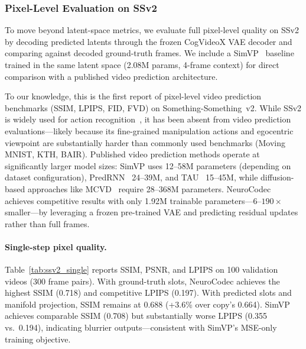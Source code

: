 \documentclass{article}
\newcommand{\method}{NeuroCodec}
\begin{document}
\subsubsection{Pixel-Level Evaluation on SSv2}
\label{sec:ssv2_pixels}

To move beyond latent-space metrics, we evaluate full pixel-level
quality on SSv2 by decoding predicted latents through the frozen
CogVideoX VAE decoder and comparing against decoded ground-truth frames.
We include a SimVP~\cite{gao2022simvp} baseline trained in the same
latent space (2.08M params, 4-frame context) for direct comparison with
a published video prediction architecture.

To our knowledge, this is the first report of pixel-level video
prediction benchmarks (SSIM, LPIPS, FID, FVD) on Something-Something~v2.
While SSv2 is widely used for action recognition~\cite{goyal2017something},
it has been absent from video prediction evaluations---likely because
its fine-grained manipulation actions and egocentric viewpoint are
substantially harder than commonly used benchmarks (Moving MNIST, KTH,
BAIR).
Published video prediction methods operate at significantly larger
model sizes: SimVP uses 12--58M parameters (depending on dataset
configuration), PredRNN~\cite{wang2022predrnn} 24--39M, and
TAU~\cite{tan2023temporal} 15--45M, while diffusion-based approaches
like MCVD~\cite{voleti2022mcvd} require 28--368M parameters.
\method{} achieves competitive results with only 1.92M trainable
parameters---$6$--$190\times$ smaller---by leveraging a frozen
pre-trained VAE and predicting residual updates rather than full frames.

\paragraph{Single-step pixel quality.}
Table~\ref{tab:ssv2_single} reports SSIM, PSNR, and LPIPS on 100
validation videos (300 frame pairs).
With ground-truth slots, \method{} achieves the highest SSIM (0.718)
and competitive LPIPS (0.197).
With predicted slots and manifold projection, SSIM remains at 0.688
(+3.6\% over copy's 0.664).
SimVP achieves comparable SSIM (0.708) but substantially worse LPIPS
(0.355 vs.\ 0.194), indicating blurrier outputs---consistent with
SimVP's MSE-only training objective.
\end{document}

